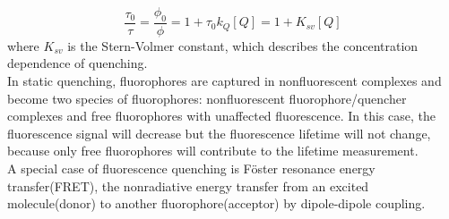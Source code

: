 \documentclass[a4paper,english,12pt,bibliography=totoc]{scrreprt}
\begin{document}
\[
\frac{\tau_0}{\tau} = \frac{\phi_0}{\phi} =  1 + \tau_0k_Q[Q] = 1+ K_{sv}[Q]
\]
where $K_{sv}$ is the Stern-Volmer constant, which describes the concentration dependence of quenching.\\

In static quenching, fluorophores are captured in nonfluorescent complexes and become two species of fluorophores: nonfluorescent fluorophore/quencher complexes and free fluorophores with unaffected fluorescence. In this case, the fluorescence signal will decrease but the fluorescence lifetime will not change, because only free fluorophores will contribute to the lifetime measurement.\\

A special case of fluorescence quenching is Föster resonance energy transfer(FRET), the nonradiative energy transfer from an excited molecule(donor) to another fluorophore(acceptor) by dipole-dipole coupling. \\
\end{document}
